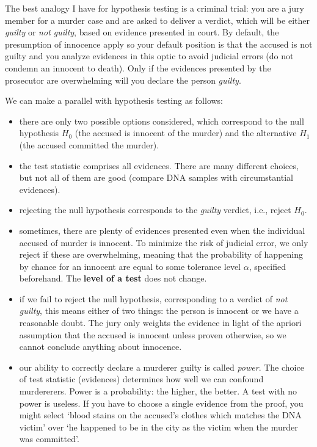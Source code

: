 \documentclass[
]{book}
\providecommand{\tightlist}{%
  \setlength{\itemsep}{0pt}\setlength{\parskip}{0pt}}
\begin{document}
The best analogy I have for hypothesis testing is a criminal trial: you are a jury member for a murder case and are asked to deliver a verdict, which will be either \emph{guilty} or \emph{not guilty}, based on evidence presented in court. By default, the presumption of innocence apply so your default position is that the accused is not guilty and you analyze evidences in this optic to avoid judicial errors (do not condemn an innocent to death). Only if the evidences presented by the prosecutor are overwhelming will you declare the person \emph{guilty}.

We can make a parallel with hypothesis testing as follows:

\begin{itemize}
\tightlist
\item
  there are only two possible options considered, which correspond to the null hypothesis \(H_0\) (the accused is innocent of the murder) and the alternative \(H_1\) (the accused committed the murder).
\item
  the test statistic comprises all evidences. There are many different choices, but not all of them are good (compare DNA samples with circumstantial evidences).
\item
  rejecting the null hypothesis corresponds to the \emph{guilty} verdict, i.e., reject \(H_0\).
\item
  sometimes, there are plenty of evidences presented even when the individual accused of murder is innocent. To minimize the risk of judicial error, we only reject if these are overwhelming, meaning that the probability of happening by chance for an innocent are equal to some tolerance level \(\alpha\), specified beforehand. The \textbf{level of a test} does not change.
\item
  if we fail to reject the null hypothesis, corresponding to a verdict of \emph{not guilty}, this means either of two things: the person is innocent or we have a reasonable doubt. The jury only weights the evidence in light of the apriori assumption that the accused is innocent unless proven otherwise, so we cannot conclude anything about innocence.
\item
  our ability to correctly declare a murderer guilty is called \emph{power}. The choice of test statistic (evidences) determines how well we can confound murdererers. Power is a probability: the higher, the better. A test with no power is useless. If you have to choose a single evidence from the proof, you might select `blood stains on the accused's clothes which matches the DNA victim' over `he happened to be in the city as the victim when the murder was committed'.
\end{itemize}
\end{document}
